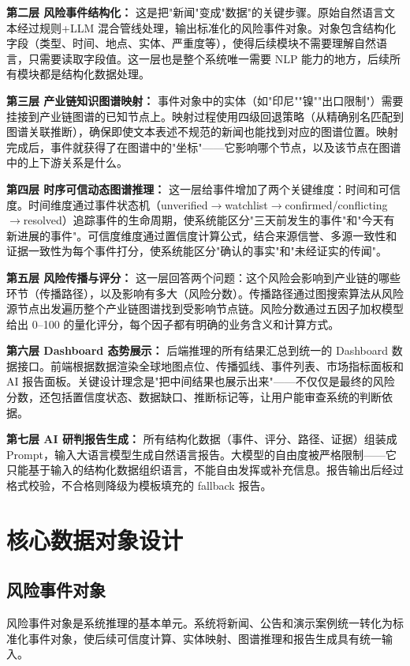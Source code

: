 \documentclass[12pt,a4paper]{ctexart}
\begin{document}
\textbf{第二层 风险事件结构化：} 这是把"新闻"变成"数据"的关键步骤。原始自然语言文本经过规则+LLM 混合管线处理，输出标准化的风险事件对象。对象包含结构化字段（类型、时间、地点、实体、严重度等），使得后续模块不需要理解自然语言，只需要读取字段值。这一层也是整个系统唯一需要 NLP 能力的地方，后续所有模块都是结构化数据处理。

\textbf{第三层 产业链知识图谱映射：} 事件对象中的实体（如"印尼""镍""出口限制"）需要挂接到产业链图谱的已知节点上。映射过程使用四级回退策略（从精确别名匹配到图谱关联推断），确保即使文本表述不规范的新闻也能找到对应的图谱位置。映射完成后，事件就获得了在图谱中的"坐标"——它影响哪个节点，以及该节点在图谱中的上下游关系是什么。

\textbf{第四层 时序可信动态图谱推理：} 这一层给事件增加了两个关键维度：时间和可信度。时间维度通过事件状态机（unverified$\to$watchlist$\to$confirmed/conflicting$\to$resolved）追踪事件的生命周期，使系统能区分"三天前发生的事件"和"今天有新进展的事件"。可信度维度通过置信度计算公式，结合来源信誉、多源一致性和证据一致性为每个事件打分，使系统能区分"确认的事实"和"未经证实的传闻"。

\textbf{第五层 风险传播与评分：} 这一层回答两个问题：这个风险会影响到产业链的哪些环节（传播路径），以及影响有多大（风险分数）。传播路径通过图搜索算法从风险源节点出发遍历整个产业链图谱找到受影响节点链。风险分数通过五因子加权模型给出 0--100 的量化评分，每个因子都有明确的业务含义和计算方式。

\textbf{第六层 Dashboard 态势展示：} 后端推理的所有结果汇总到统一的 Dashboard 数据接口。前端根据数据渲染全球地图点位、传播弧线、事件列表、市场指标面板和 AI 报告面板。关键设计理念是"把中间结果也展示出来"——不仅仅是最终的风险分数，还包括置信度状态、数据缺口、推断标记等，让用户能审查系统的判断依据。

\textbf{第七层 AI 研判报告生成：} 所有结构化数据（事件、评分、路径、证据）组装成 Prompt，输入大语言模型生成自然语言报告。大模型的自由度被严格限制——它只能基于输入的结构化数据组织语言，不能自由发挥或补充信息。报告输出后经过格式校验，不合格则降级为模板填充的 fallback 报告。

\section{核心数据对象设计}

\subsection{风险事件对象}

风险事件对象是系统推理的基本单元。系统将新闻、公告和演示案例统一转化为标准化事件对象，使后续可信度计算、实体映射、图谱推理和报告生成具有统一输入。
\end{document}
